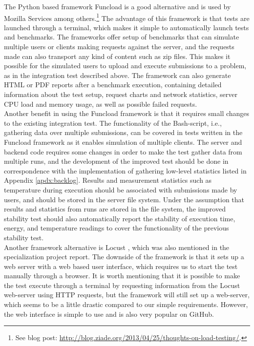 The Python based framework Funcload \cite{FUNCLOAD} is a good alternative and is used by Mozilla Services among others.\footnote{See blog post: \url{http://blog.ziade.org/2013/04/25/thoughts-on-load-testing/}.} The advantage of this framework is that tests are launched through a terminal, which makes it simple to automatically launch tests and benchmarks. The frameworks offer setup of benchmarks that can simulate multiple users or clients making requests against the server, and the requests made can also transport any kind of content such as zip files. This makes it possible for the simulated users to upload and execute submissions to a problem, as in the integration test described above. The framework can also generate HTML or PDF reports after a benchmark execution, containing detailed information about the test setup, request charts and network statistics, server CPU load and memory usage, as well as possible failed requests. \\

Another benefit in using the Funcload framework is that it requires small changes to the existing integration test. The functionality of the Bash-script, i.e., gathering data over multiple submissions, can be covered in tests written in the Funcload framework as it enables simulation of multiple clients. The server and backend code requires some changes in order to make the test gather data from multiple runs, and the development of the improved test should be done in correspondence with the implementation of gathering low-level statistics listed in Appendix \ref{apdx:backlog}. Results and measurement statistics such as temperature during execution should be associated with submissions made by users, and should be stored in the server file system. Under the assumption that results and statistics from runs are stored in the file system, the improved stability test should also automatically report the stability of execution time, energy, and temperature readings to cover the functionality of the previous stability test. \\

Another framework alternative is Locust \cite{LOCUST}, which was also mentioned in the specialization project report. The downside of the framework is that it sets up a web server with a web based user interface, which requires us to start the test manually through a browser. It is worth mentioning that it is possible to make the test execute through a terminal by requesting information from the Locust web-server using HTTP requests, but the framework will still set up a web-server, which seems to be a little drastic compared to our simple requirements. However, the web interface is simple to use and is also very popular on GitHub. \\

